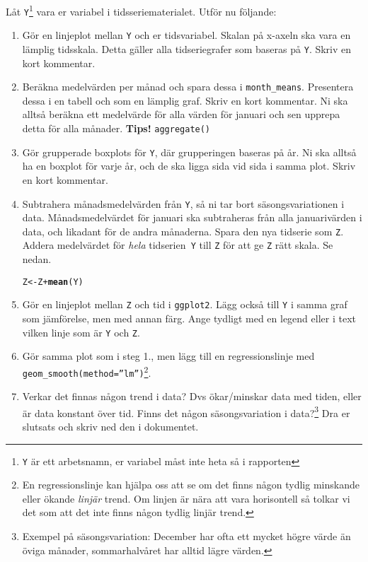 \documentclass[swedish,english]{article}\usepackage[]{graphicx}\usepackage[]{xcolor}
\makeatletter
\newcommand{\hlopt}[1]{\textcolor[rgb]{0,0,0}{#1}}%
\newcommand{\hlstd}[1]{\textcolor[rgb]{0.345,0.345,0.345}{#1}}%
\newcommand{\hlkwb}[1]{\textcolor[rgb]{0.69,0.353,0.396}{#1}}%
\newcommand{\hlkwd}[1]{\textcolor[rgb]{0.737,0.353,0.396}{\textbf{#1}}}%
\newenvironment{kframe}{%
 \def\at@end@of@kframe{}%
 \ifinner\ifhmode%
  \def\at@end@of@kframe{\end{minipage}}%
  \begin{minipage}{\columnwidth}%
 \fi\fi%
 \def\FrameCommand##1{\hskip\@totalleftmargin \hskip-\fboxsep
 \colorbox{shadecolor}{##1}\hskip-\fboxsep
     \hskip-\linewidth \hskip-\@totalleftmargin \hskip\columnwidth}%
 \MakeFramed {\advance\hsize-\width
   \@totalleftmargin\z@ \linewidth\hsize
   \@setminipage}}%
 {\par\unskip\endMakeFramed%
 \at@end@of@kframe}
\newenvironment{knitrout}{}{} %
\makeatother
\begin{document}
Låt \texttt{Y}\footnote{\texttt{Y} är ett arbetsnamn, er variabel måst inte heta så i rapporten}
vara er variabel i tidsseriematerialet. Utför nu följande:
\begin{enumerate}
\item Gör en linjeplot mellan \texttt{Y} och er tidsvariabel. Skalan på
x-axeln ska vara en lämplig tidsskala. Detta gäller alla tidseriegrafer
som baseras på \texttt{Y}. Skriv en kort kommentar.
\item Beräkna medelvärden per månad och spara dessa i \texttt{month\_means}.
Presentera dessa i en tabell och som en lämplig graf. Skriv en kort
kommentar. Ni ska alltså beräkna ett medelvärde för alla värden för
januari och sen upprepa detta för alla månader. \textbf{Tips!} \texttt{aggregate()}
\item Gör grupperade boxplots för \texttt{Y}, där grupperingen baseras på
år. Ni ska alltså ha en boxplot för varje år, och de ska ligga sida
vid sida i samma plot. Skriv en kort kommentar.
\item Subtrahera månadsmedelvärden från \texttt{Y}, så ni tar bort säsongsvariationen
i data. Månadsmedelvärdet för januari ska subtraheras från alla januarivärden
i data, och likadant för de andra månaderna. Spara den nya tidserie
som \texttt{Z}. Addera medelvärdet för \textit{hela }tidserien\texttt{
Y} till \texttt{Z} för att ge \texttt{Z} rätt skala. Se nedan.\\
\begin{knitrout}
\color{fgcolor}\begin{kframe}
\begin{alltt}
\hlstd{Z}\hlkwb{<-}\hlstd{Z}\hlopt{+}\hlkwd{mean}\hlstd{(Y)}
\end{alltt}
\end{kframe}
\end{knitrout}
\item Gör en linjeplot mellan \texttt{Z} och tid i \texttt{ggplot2}. Lägg
också till \texttt{Y} i samma graf som jämförelse, men med annan färg.
Ange tydligt med en legend eller i text vilken linje som är \texttt{Y}
och \texttt{Z}.
\item Gör samma plot som i steg 1., men lägg till en regressionslinje med
\texttt{geom\_smooth(method=”lm”)}\footnote{En regressionslinje kan hjälpa oss att se om det finns någon tydlig
minskande eller ökande \emph{linjär} trend. Om linjen är nära att
vara horisontell så tolkar vi det som att det inte finns någon tydlig
linjär trend.}.
\item Verkar det finnas någon trend i data? Dvs ökar/minskar data med tiden,
eller är data konstant över tid. Finns det någon säsongsvariation
i data?\footnote{Exempel på säsongsvariation: December har ofta ett mycket högre värde
än öviga månader, sommarhalvåret har alltid lägre värden.} Dra er slutsats och skriv ned den i dokumentet.
\end{enumerate}
\end{document}
